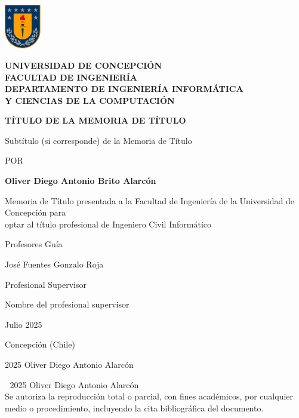 \documentclass[12pt,twoside]{report}
\begin{document}
\pagestyle{empty}

\begin{titlepage}
    \includegraphics[height=55pt]{escudoUdec}
    \begin{minipage}[b][60pt][c]{70ex}
    	\bfseries
        UNIVERSIDAD DE CONCEPCIÓN\\
        FACULTAD DE INGENIERÍA\\
        DEPARTAMENTO DE INGENIERÍA INFORMÁTICA\\
        Y CIENCIAS DE LA COMPUTACIÓN
    \end{minipage}
    \vspace{3cm}
    
    \begin{center}	
        \uppercase{\large\textbf{Título de la memoria de título}}

        \bigskip
        Subtítulo (si corresponde) de la Memoria de Título

        \vspace{1.5cm}
        POR
        \bigskip

        \textbf{Oliver Diego Antonio Brito Alarcón}

        \vspace{2cm}
        {\small Memoria de Título presentada a la Facultad de Ingeniería de la Universidad de Concepción para\\
        optar al título profesional de Ingeniero Civil Informático}
	
        \vspace{2cm}	
        Profesores Guía

        José Fuentes
        Gonzalo Roja

        \bigskip
        Profesional Supervisor

        Nombre del profesional supervisor

        \vfill
        Julio 2025

        Concepción (Chile)
        
        \bigskip
        \textcopyright{}
        2025 Oliver Diego Antonio Alarcón
	\end{center}
\end{titlepage}

\textcolor{white}{.}
\vfill
\noindent\textcopyright{}
2025 Oliver Diego Antonio Alarcón\\
Se autoriza la reproducción total o parcial, con fines académicos, por cualquier medio o procedimiento, incluyendo la cita bibliográfica del documento.
\end{document}
